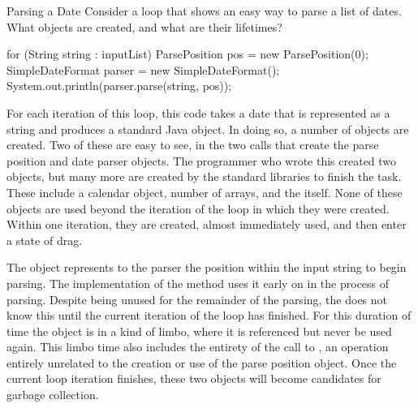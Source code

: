 \begin{example}{Parsing a Date} Consider a loop that shows an easy way to parse
a list of dates. What objects are created, and what are their lifetimes?
\begin{shortlisting}
for (String string : inputList) {
	ParsePosition pos = new ParsePosition(0);
	SimpleDateFormat parser = new SimpleDateFormat();
	System.out.println(parser.parse(string, pos));
}
\end{shortlisting}
\end{example}

For each iteration of this loop, this code takes a date that is represented as a
string and produces a standard Java  object. In doing so, a number of
objects are created. Two of these are easy to see, in the two  calls
that create the parse position and date parser objects. The programmer who wrote
this created two objects, but many more are created by the standard libraries to
finish the task. These include a calendar object, number of arrays, and the
 itself. None of these objects are used beyond the iteration of the
loop in which they were created. Within one iteration, they are created, almost
immediately used, and then enter a state of drag.


The  object represents to the parser the position within the input
string to begin parsing. The implementation of the  method uses it
early on in the process of parsing. Despite being unused for the remainder of the
parsing, the \jre does not know this until the current iteration of the loop has
finished. For this duration of time the object is in a kind of limbo, where it is
referenced but never be used again. This limbo time also includes the entirety of
the call to , an operation entirely unrelated to the
creation or use of the parse position object. Once the current loop iteration
finishes, these two objects will become candidates for garbage collection.

